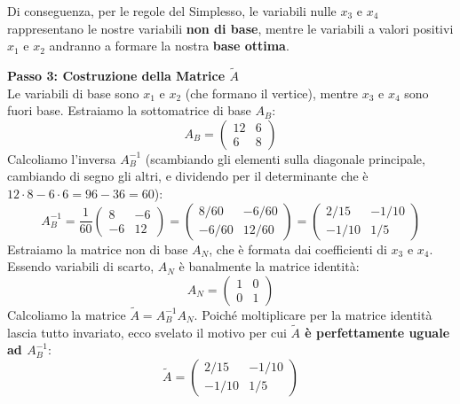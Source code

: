 \documentclass[12pt, a4paper]{article}
\begin{document}
	Di conseguenza, per le regole del Simplesso, le variabili nulle $x_3$ e $x_4$ rappresentano le nostre variabili \textbf{non di base}, mentre le variabili a valori positivi $x_1$ e $x_2$ andranno a formare la nostra \textbf{base ottima}.
	
	\vspace{0.4cm}
	\textbf{Passo 3: Costruzione della Matrice $\tilde{A}$}\\
	Le variabili di base sono $x_1$ e $x_2$ (che formano il vertice), mentre $x_3$ e $x_4$ sono fuori base. 
	Estraiamo la sottomatrice di base $A_B$:
	\[
	A_B = \begin{pmatrix} 12 & 6 \\ 6 & 8 \end{pmatrix}
	\]
	Calcoliamo l'inversa $A_B^{-1}$ (scambiando gli elementi sulla diagonale principale, cambiando di segno gli altri, e dividendo per il determinante che è $12 \cdot 8 - 6 \cdot 6 = 96 - 36 = 60$):
	\[
	A_B^{-1} = \frac{1}{60} \begin{pmatrix} 8 & -6 \\ -6 & 12 \end{pmatrix} = \begin{pmatrix} 8/60 & -6/60 \\ -6/60 & 12/60 \end{pmatrix} = \begin{pmatrix} 2/15 & -1/10 \\ -1/10 & 1/5 \end{pmatrix}
	\]
	Estraiamo la matrice non di base $A_N$, che è formata dai coefficienti di $x_3$ e $x_4$. Essendo variabili di scarto, $A_N$ è banalmente la matrice identità:
	\[
	A_N = \begin{pmatrix} 1 & 0 \\ 0 & 1 \end{pmatrix}
	\]
	Calcoliamo la matrice $\tilde{A} = A_B^{-1} A_N$. Poiché moltiplicare per la matrice identità lascia tutto invariato, ecco svelato il motivo per cui \textbf{$\tilde{A}$ è perfettamente uguale ad $A_B^{-1}$}:
	\[
	\tilde{A} = \begin{pmatrix} 2/15 & -1/10 \\ -1/10 & 1/5 \end{pmatrix}
	\]
	
\end{document}
